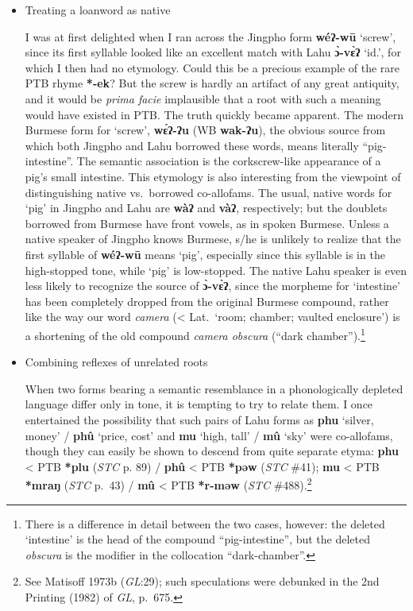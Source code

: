 
\begin{itemize}
\item Treating a loanword as native

I was at first delighted when I ran across the Jingpho form \textbf{wéʔ-wū} ‘screw’,
since its first syllable looked like an excellent match with Lahu \textbf{ɔ̀-vɛ̀ʔ} ‘id.’,
for which I then had no etymology. Could this be a precious example of the rare
PTB rhyme \textbf{*-ek}? But the screw is hardly an artifact of any great antiquity, and
it would be \textit{prima facie} implausible that a root with such a meaning would have
existed in PTB. The truth quickly became apparent. The modern Burmese form for
‘screw’, \textbf{wɛ́ʔ-ʔu} (WB \textbf{wak-ʔu}), the obvious source from which both Jingpho and
Lahu borrowed these words, means literally “pig-intestine”.  The semantic
association is the corkscrew-like appearance of a pig’s small intestine. This
etymology is also interesting from the viewpoint of distinguishing native vs.\
borrowed co-allofams. The usual, native words for ‘pig’ in Jingpho and Lahu are
\textbf{wàʔ} and \textbf{vàʔ}, respectively; but the doublets borrowed from Burmese have front
vowels, as in spoken Burmese. Unless a native speaker of Jingpho knows Burmese,
s/he is unlikely to realize that the first syllable of \textbf{wéʔ-wū} means ‘pig’,
especially since this syllable is in the high-stopped tone, while ‘pig’ is
low-stopped. The native Lahu speaker is even less likely to recognize the source
of \textbf{ɔ̀-vɛ̀ʔ}, since the morpheme for ‘intestine’ has been completely dropped from
the original Burmese compound, rather like the way our word \textit{camera} (< Lat.\
‘room; chamber; vaulted enclosure’) is a shortening of the old compound \textit{camera
obscura} (“dark chamber”).\footnote{There is a difference in detail between the
two cases, however: the deleted ‘intestine’ is the head of the compound
“pig-intestine”, but the deleted \textit{obscura} is the modifier in the collocation
“dark-chamber”.}

\item Combining reflexes of unrelated roots

When two forms bearing a semantic resemblance in a phonologically depleted
language differ only in tone, it is tempting to try to relate them. I once
entertained the possibility that such pairs of Lahu forms as \textbf{phu} ‘silver, money’
/ \textbf{phû} ‘price, cost’ and \textbf{mu} ‘high, tall’ / \textbf{mû} ‘sky’ were co-allofams, though they
can easily be shown to descend from quite separate etyma: \textbf{phu} < PTB \textbf{*plu} (\textit{STC} p.
89) / \textbf{phû} < PTB \textbf{*pəw} (\textit{STC} \#41);
\textbf{mu} < PTB \textbf{*mraŋ} (\textit{STC} p.~43) / \textbf{mû} < PTB \textbf{*r-məw}
(\textit{STC} \#488).\footnote{See Matisoff 1973b (\textit{GL}:29); such speculations were debunked in
the 2nd Printing (1982) of \textit{GL}, p.~675.}


\end{itemize}
